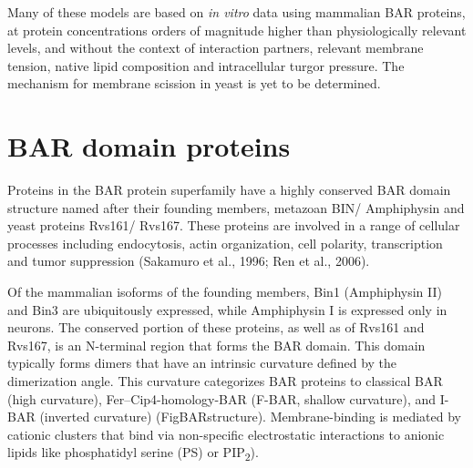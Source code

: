 			\vspace{5mm}
Many of these models are based on \textit{in vitro} data using mammalian BAR proteins, at protein concentrations orders of magnitude higher than physiologically relevant levels, and without the context of interaction partners, relevant membrane tension, native lipid composition and intracellular turgor pressure. The mechanism for membrane scission in yeast is yet to be determined. 

 




\newpage
		
\section{BAR domain proteins}
	
Proteins in the BAR protein superfamily have a highly conserved BAR domain structure named after their founding members, metazoan BIN/ Amphiphysin and yeast proteins Rvs161/ Rvs167. These proteins are involved in a range of cellular processes including endocytosis, actin organization, cell polarity, transcription and tumor suppression (Sakamuro et al., 1996; Ren et al., 2006). 

Of the mammalian isoforms of the founding members, Bin1 (Amphiphysin II) and Bin3 are ubiquitously expressed, while Amphiphysin I is expressed only in neurons. The conserved portion of these proteins, as well as of Rvs161 and Rvs167, is an N-terminal region that forms the BAR domain. This domain typically forms dimers that have an intrinsic curvature defined by the dimerization angle. This curvature categorizes BAR proteins to classical BAR (high curvature), Fer–Cip4-homology-BAR (F-BAR, shallow curvature), and I-BAR (inverted curvature) (FigBARstructure). Membrane-binding is mediated by cationic clusters that bind via non-specific electrostatic interactions to anionic lipids like phosphatidyl serine (PS) or PIP\textsubscript{2}).



